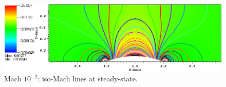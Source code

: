         \begin{figure}[H]%
                \centering
                \includegraphics[scale=.50]{figures/Hump2D_mach_0p01.png}
                \caption{Mach $10^{-2}$: iso-Mach lines at steady-state.}
                \label{fig:2d_hump_mach_0p01}
        \end{figure}%
        
